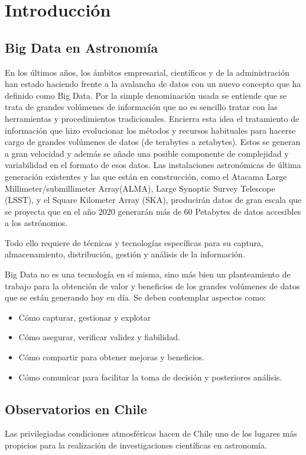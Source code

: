 \section{Introducción}
\subsection{Big Data en Astronomía}
En los últimos años, los ámbitos empresarial, científicos y de la administración 
han estado haciendo frente a la avalancha de datos con un nuevo concepto que ha
definido como Big Data. Por la simple denominación usada se entiende que se trata
de grandes volúmenes de información que no es sencillo tratar con las herramientas
y procedimientos tradicionales. Encierra esta idea el tratamiento de información 
que hizo evolucionar los métodos y recursos habituales para hacerse cargo de grandes 
volúmenes de datos (de terabytes a zetabytes). Estos se generan a gran 
velocidad y además se añade una posible componente de complejidad y variabilidad en 
el formato de esos datos. Las instalaciones astronómicas de última generación existentes
y las que están en construcción, como el Atacama Large Millimeter/submillimeter Array(ALMA), 
Large Synoptic Survey Telescope (LSST), y el Square Kilometer Array (SKA), producirán datos
de gran escala que se proyecta que en el año 2020 generarán más de 60 Petabytes de datos
accesibles a los astrónomos.

Todo ello requiere de técnicas y tecnologías específicas para su captura, 
almacenamiento, distribución, gestión y análisis de la información.

Big Data no es una tecnología en sí misma, sino más bien un planteamiento de 
trabajo para la obtención de valor y beneficios de los grandes volúmenes de 
datos que se están generando hoy en día. Se deben contemplar aspectos como:
\begin{itemize}
 \item Cómo capturar, gestionar y explotar
 \item Cómo asegurar, verificar validez y fiabilidad.
 \item Cómo compartir para obtener mejoras y beneficios.
 \item Cómo comunicar para facilitar la toma de decisión y posteriores análisis.
\end{itemize}

\subsection{Observatorios en Chile}
Las privilegiadas condiciones atmosféricas hacen de Chile uno de los lugares
más propicios para la realización de investigaciones científicas en astronomía.

